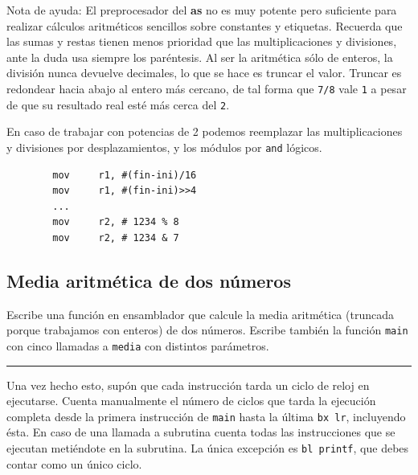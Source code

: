 Nota de ayuda: El preprocesador del {\bf as} no es muy potente pero
suficiente para realizar cálculos aritméticos sencillos sobre constantes
y etiquetas. Recuerda que las sumas y restas tienen menos prioridad que
las multiplicaciones y divisiones, ante la duda usa siempre los paréntesis.
Al ser la aritmética sólo de enteros, la división nunca devuelve
decimales, lo que se hace es truncar el valor. Truncar es redondear hacia
abajo al entero más cercano, de tal forma que {\tt 7/8} vale {\tt 1} a
pesar de que su resultado real esté más cerca del {\tt 2}.

En caso de trabajar con potencias de 2 podemos reemplazar las
multiplicaciones y divisiones por desplazamientos, y los módulos por
{\tt and} lógicos.

\begin{lstlisting}
        mov     r1, #(fin-ini)/16
        mov     r1, #(fin-ini)>>4
        ...
        mov     r2, # 1234 % 8
        mov     r2, # 1234 & 7
\end{lstlisting}

\subsection{Media aritmética de dos números}

Escribe una función en ensamblador que calcule la media aritmética (truncada porque
trabajamos con enteros) de dos números. Escribe también la función {\tt main} con 
cinco llamadas a {\tt media} con distintos parámetros.

\begin{center}
\begin{myfbox}
\small
\begin{minipage}{0.92\linewidth}
\begin{center}
\colorbox[gray]{1}{\rule{0cm}{4.5cm}\rule{11cm}{0cm}}
\end{center}
\end{minipage}
\end{myfbox}
\end{center}

Una vez hecho esto, supón que cada instrucción tarda un ciclo de reloj en ejecutarse.
Cuenta manualmente el número de ciclos que tarda la ejecución completa desde la primera
instrucción de {\tt main} hasta la última {\tt bx lr}, incluyendo ésta. En caso de una
llamada a subrutina cuenta todas las instrucciones que se ejecutan metiéndote en la
subrutina. La única excepción es {\tt bl printf}, que debes contar como un único ciclo.

